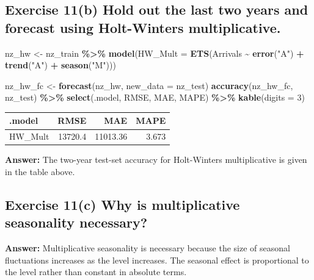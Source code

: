 \documentclass[
  11pt,
]{article}
\newenvironment{Shaded}{\begin{snugshade}}{\end{snugshade}}
\newcommand{\AttributeTok}[1]{\textcolor[rgb]{0.13,0.29,0.53}{#1}}
\newcommand{\DecValTok}[1]{\textcolor[rgb]{0.00,0.00,0.81}{#1}}
\newcommand{\FunctionTok}[1]{\textcolor[rgb]{0.13,0.29,0.53}{\textbf{#1}}}
\newcommand{\NormalTok}[1]{#1}
\newcommand{\OtherTok}[1]{\textcolor[rgb]{0.56,0.35,0.01}{#1}}
\newcommand{\SpecialCharTok}[1]{\textcolor[rgb]{0.81,0.36,0.00}{\textbf{#1}}}
\newcommand{\StringTok}[1]{\textcolor[rgb]{0.31,0.60,0.02}{#1}}
\newcounter{none} %
\begin{document}
\subsection{Exercise 11(b) Hold out the last two years and forecast
using Holt-Winters
multiplicative.}\label{exercise-11b-hold-out-the-last-two-years-and-forecast-using-holt-winters-multiplicative.}

\begin{Shaded}
\begin{Highlighting}[]
\NormalTok{nz\_hw }\OtherTok{\textless{}{-}}\NormalTok{ nz\_train }\SpecialCharTok{\%\textgreater{}\%}
  \FunctionTok{model}\NormalTok{(}\AttributeTok{HW\_Mult =} \FunctionTok{ETS}\NormalTok{(Arrivals }\SpecialCharTok{\textasciitilde{}} \FunctionTok{error}\NormalTok{(}\StringTok{"A"}\NormalTok{) }\SpecialCharTok{+} \FunctionTok{trend}\NormalTok{(}\StringTok{"A"}\NormalTok{) }\SpecialCharTok{+} \FunctionTok{season}\NormalTok{(}\StringTok{"M"}\NormalTok{)))}

\NormalTok{nz\_hw\_fc }\OtherTok{\textless{}{-}} \FunctionTok{forecast}\NormalTok{(nz\_hw, }\AttributeTok{new\_data =}\NormalTok{ nz\_test)}
\FunctionTok{accuracy}\NormalTok{(nz\_hw\_fc, nz\_test) }\SpecialCharTok{\%\textgreater{}\%}
  \FunctionTok{select}\NormalTok{(.model, RMSE, MAE, MAPE) }\SpecialCharTok{\%\textgreater{}\%}
  \FunctionTok{kable}\NormalTok{(}\AttributeTok{digits =} \DecValTok{3}\NormalTok{)}
\end{Highlighting}
\end{Shaded}

{\def\LTcaptype{none} %
\begin{longtable}[]{@{}lrrr@{}}
\toprule\noalign{}
.model & RMSE & MAE & MAPE \\
\midrule\noalign{}
\endhead
\bottomrule\noalign{}
\endlastfoot
HW\_Mult & 13720.4 & 11013.36 & 3.673 \\
\end{longtable}
}

\textbf{Answer:} The two-year test-set accuracy for Holt-Winters
multiplicative is given in the table above.

\subsection{Exercise 11(c) Why is multiplicative seasonality
necessary?}\label{exercise-11c-why-is-multiplicative-seasonality-necessary}

\textbf{Answer:} Multiplicative seasonality is necessary because the
size of seasonal fluctuations increases as the level increases. The
seasonal effect is proportional to the level rather than constant in
absolute terms.
\end{document}
